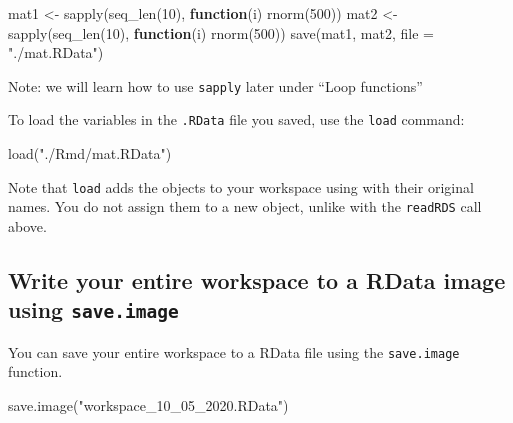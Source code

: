 \documentclass[
]{book}
\newenvironment{Shaded}{\begin{snugshade}}{\end{snugshade}}
\newcommand{\AttributeTok}[1]{\textcolor[rgb]{0.77,0.63,0.00}{#1}}
\newcommand{\ControlFlowTok}[1]{\textcolor[rgb]{0.13,0.29,0.53}{\textbf{#1}}}
\newcommand{\DecValTok}[1]{\textcolor[rgb]{0.00,0.00,0.81}{#1}}
\newcommand{\FunctionTok}[1]{\textcolor[rgb]{0.00,0.00,0.00}{#1}}
\newcommand{\NormalTok}[1]{#1}
\newcommand{\OtherTok}[1]{\textcolor[rgb]{0.56,0.35,0.01}{#1}}
\newcommand{\StringTok}[1]{\textcolor[rgb]{0.31,0.60,0.02}{#1}}
\begin{document}
\begin{Shaded}
\begin{Highlighting}[]
\NormalTok{mat1 }\OtherTok{\textless{}{-}} \FunctionTok{sapply}\NormalTok{(}\FunctionTok{seq\_len}\NormalTok{(}\DecValTok{10}\NormalTok{), }\ControlFlowTok{function}\NormalTok{(i) }\FunctionTok{rnorm}\NormalTok{(}\DecValTok{500}\NormalTok{))}
\NormalTok{mat2 }\OtherTok{\textless{}{-}} \FunctionTok{sapply}\NormalTok{(}\FunctionTok{seq\_len}\NormalTok{(}\DecValTok{10}\NormalTok{), }\ControlFlowTok{function}\NormalTok{(i) }\FunctionTok{rnorm}\NormalTok{(}\DecValTok{500}\NormalTok{))}
\FunctionTok{save}\NormalTok{(mat1, mat2, }\AttributeTok{file =} \StringTok{"./mat.RData"}\NormalTok{)}
\end{Highlighting}
\end{Shaded}

Note: we will learn how to use \texttt{sapply} later under ``Loop functions''

To load the variables in the \texttt{.RData} file you saved, use the \texttt{load} command:

\begin{Shaded}
\begin{Highlighting}[]
\FunctionTok{load}\NormalTok{(}\StringTok{"./Rmd/mat.RData"}\NormalTok{)}
\end{Highlighting}
\end{Shaded}

Note that \texttt{load} adds the objects to your workspace using with their original names. You do not assign them to a new object, unlike with the \texttt{readRDS} call above.

\hypertarget{write-your-entire-workspace-to-a-rdata-image-using-save.image}{%
\subsection{\texorpdfstring{Write your entire workspace to a RData image using \texttt{save.image}}{Write your entire workspace to a RData image using save.image}}\label{write-your-entire-workspace-to-a-rdata-image-using-save.image}}

You can save your entire workspace to a RData file using the \texttt{save.image} function.

\begin{Shaded}
\begin{Highlighting}[]
\FunctionTok{save.image}\NormalTok{(}\StringTok{"workspace\_10\_05\_2020.RData"}\NormalTok{)}
\end{Highlighting}
\end{Shaded}
\end{document}
